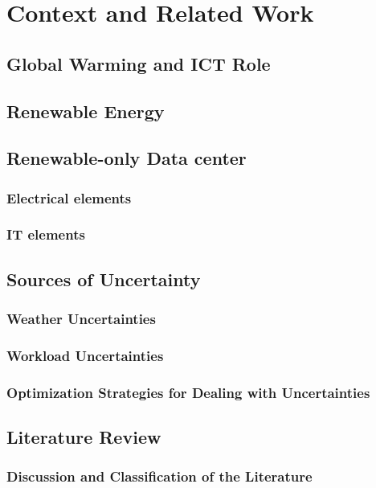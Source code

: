 \chapter{Context and Related Work}

\section{Global Warming and ICT Role}

\section{Renewable Energy}

\section{Renewable-only Data center}

\subsection{Electrical elements}

\subsection{IT elements}

\section{Sources of Uncertainty}

\subsection{Weather Uncertainties}

\subsection{Workload Uncertainties}

\subsection{Optimization Strategies for Dealing with Uncertainties}

\section{Literature Review}

\subsection{Discussion and Classification of the Literature}